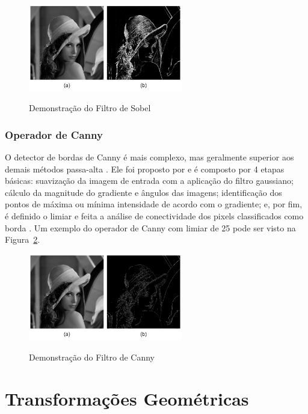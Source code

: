 \documentclass[12pt,oneside,a4paper,english,french,spanish,brazil,]{abntex2}
\begin{document}
\begin{figure}[ht]
\centering
\caption{Demonstração do Filtro de Sobel}
\includegraphics[width=0.6\textwidth]{imagens/PDI_Sobel.pdf}
\sourceAuthor
\label{fig:PDI_Sobel}
\end{figure}

\subsubsection{Operador de Canny}

O detector de bordas de Canny é mais complexo, mas geralmente superior aos demais métodos passa-alta \cite{gonzalez:2012}. Ele foi proposto por \citet{canny:1987} e é composto por 4 etapas básicas: suavização da imagem de entrada com a aplicação do filtro gaussiano; cálculo da magnitude do gradiente e ângulos das imagens; identificação dos pontos de máxima ou mínima intensidade de acordo com o gradiente; e, por fim, é definido o limiar e feita a análise de conectividade dos pixels classificados como borda \cite{gonzalez:2012}. Um exemplo do operador de Canny com limiar de 25 pode ser visto na Figura~\ref{fig:PDI_Canny}.

\begin{figure}[ht]
\centering
\caption{Demonstração do Filtro de Canny}
\includegraphics[width=0.6\textwidth]{imagens/PDI_Canny.pdf}
\sourceAuthor
\label{fig:PDI_Canny}
\end{figure}


\section{Transformações Geométricas}
\end{document}
